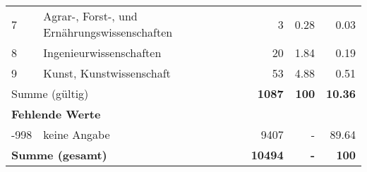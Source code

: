 \begin{longtable}{lXrrr}
     7 &
     \multicolumn{1}{X}{ Agrar-, Forst-, und Ernährungswissenschaften   } &


       \num{3} &
       \num[round-mode=places,round-precision=2]{0,28} &
         \num[round-mode=places,round-precision=2]{0,03} \\

     8 &
     \multicolumn{1}{X}{ Ingenieurwissenschaften   } &


       \num{20} &
       \num[round-mode=places,round-precision=2]{1,84} &
         \num[round-mode=places,round-precision=2]{0,19} \\

     9 &
     \multicolumn{1}{X}{ Kunst, Kunstwissenschaft   } &


       \num{53} &
       \num[round-mode=places,round-precision=2]{4,88} &
         \num[round-mode=places,round-precision=2]{0,51} \\
     \midrule
     \multicolumn{2}{l}{Summe (gültig)} &
       \textbf{\num{1087}} &
     \textbf{100} &
       \textbf{\num[round-mode=places,round-precision=2]{10,36}} \\
     \multicolumn{5}{l}{\textbf{Fehlende Werte}}\\
       -998 &
       keine Angabe &
         \num{9407} &
        - &
         \num[round-mode=places,round-precision=2]{89,64} \\
     \midrule
     \multicolumn{2}{l}{\textbf{Summe (gesamt)}} &
          \textbf{\num{10494}} &
        \textbf{-} &
        \textbf{100} \\
     \bottomrule
     \end{longtable}
     
